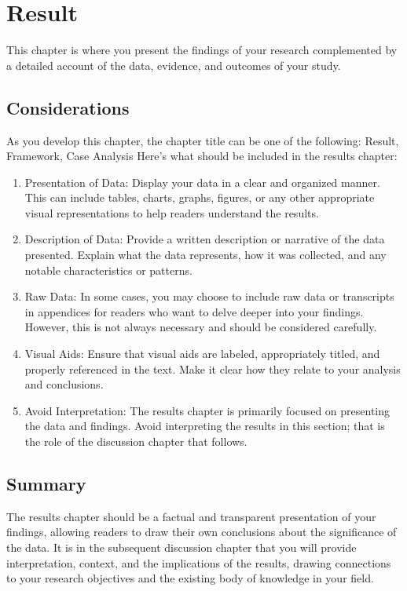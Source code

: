 \chapter{Result}   
\label{chapter:result}
This chapter is where you present the findings of your research complemented by a detailed account of the data, evidence, and outcomes of your study. 

\section{Considerations}
As you develop this chapter, the chapter title can be one of the following: Result, Framework, Case Analysis
Here's what should be included in the results chapter:

\begin{enumerate}

\item Presentation of Data: Display your data in a clear and organized manner. This can include tables, charts, graphs, figures, or any other appropriate visual representations to help readers understand the results.

\item Description of Data: Provide a written description or narrative of the data presented. Explain what the data represents, how it was collected, and any notable characteristics or patterns.


\item Raw Data: In some cases, you may choose to include raw data or transcripts in appendices for readers who want to delve deeper into your findings. However, this is not always necessary and should be considered carefully.

\item Visual Aids: Ensure that visual aids are labeled, appropriately titled, and properly referenced in the text. Make it clear how they relate to your analysis and conclusions.


\item Avoid Interpretation: The results chapter is primarily focused on presenting the data and findings. Avoid interpreting the results in this section; that is the role of the discussion chapter that follows.


\end{enumerate}


\section{Summary}
The results chapter should be a factual and transparent presentation of your findings, allowing readers to draw their own conclusions about the significance of the data. It is in the subsequent discussion chapter that you will provide interpretation, context, and the implications of the results, drawing connections to your research objectives and the existing body of knowledge in your field.

   





 
 



